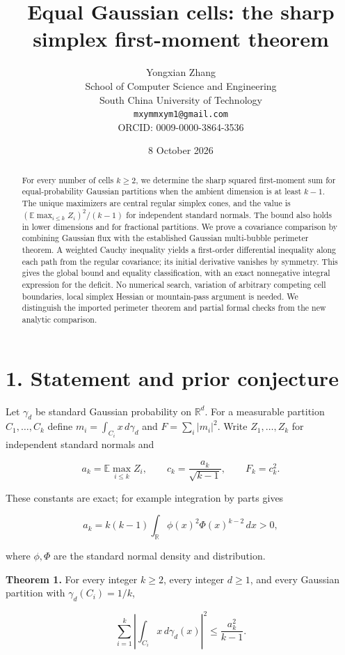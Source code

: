 \documentclass[11pt]{article}
\title{Equal Gaussian cells: the sharp simplex first-moment theorem}
\author{Yongxian Zhang\\[2pt]\small School of Computer Science and Engineering\\\small South China University of Technology\\\small\texttt{mxymmxym1@gmail.com}\\\small ORCID: 0009-0000-3864-3536}
\date{8 October 2026}
\begin{document}
\maketitle
\begin{abstract}
For every number of cells \(k\ge2\), we determine the sharp squared
first-moment sum for equal-probability Gaussian partitions when the
ambient dimension is at least \(k-1\). The unique maximizers are central
regular simplex cones, and the value is
\((\mathbb E\max_{i\le k}Z_i)^2/(k-1)\) for independent standard
normals. The bound also holds in lower dimensions and for fractional
partitions. We prove a covariance comparison by combining Gaussian flux
with the established Gaussian multi-bubble perimeter theorem. A weighted
Cauchy inequality yields a first-order differential inequality along
each path from the regular covariance; its initial derivative vanishes
by symmetry. This gives the global bound and equality classification,
with an exact nonnegative integral expression for the deficit. No
numerical search, variation of arbitrary competing cell boundaries,
local simplex Hessian or mountain-pass argument is needed. We
distinguish the imported perimeter theorem and partial formal checks
from the new analytic comparison.
\end{abstract}
\section{1. Statement and prior
conjecture}\label{statement-and-prior-conjecture}

Let \(\gamma_d\) be standard Gaussian probability on \(\mathbb R^d\).
For a measurable partition \(C_1,\ldots,C_k\) define
\(m_i=\int_{C_i}x\,d\gamma_d\) and \(F=\sum_i|m_i|^2\). Write
\(Z_1,\ldots,Z_k\) for independent standard normals and

\[
 a_k=\mathbb E\max_{i\le k}Z_i,
 \qquad c_k=\frac{a_k}{\sqrt{k-1}},\qquad F_k=c_k^2.
\]

These constants are exact; for example integration by parts gives

\[
 a_k=k(k-1)\int_{\mathbb R}\phi(x)^2\Phi(x)^{k-2}\,dx>0,       \tag{1}
\]

where \(\phi,\Phi\) are the standard normal density and distribution.

\textbf{Theorem 1.} For every integer \(k\ge2\), every integer
\(d\ge1\), and every Gaussian partition with \(\gamma_d(C_i)=1/k\),

\[
 \sum_{i=1}^k\left|\int_{C_i}x\,d\gamma_d(x)\right|^2
             \le\frac{a_k^2}{k-1}.                         \tag{2}
\]
\end{document}
